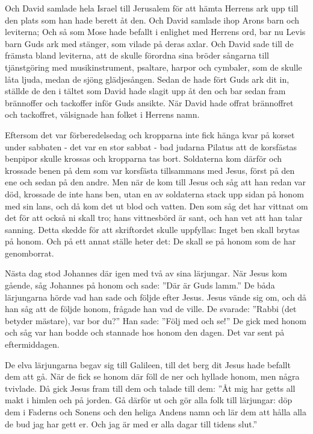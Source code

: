 {Och David samlade hela Israel till Jerusalem för att hämta Herrens ark upp till den plats som han hade berett åt den. 
Och David samlade ihop Arons barn och leviterna; 
Och så som Mose hade befallt i enlighet med Herrens ord, bar nu Levis barn Guds ark med stänger, som vilade på deras axlar.
Och David sade till de främsta bland leviterna, att de skulle förordna sina bröder sångarna till tjänstgöring med musikinstrument, psaltare, harpor och cymbaler, som de skulle låta ljuda, medan de sjöng glädjesången. 
Sedan de hade fört Guds ark dit in, ställde de den i tältet som David hade slagit upp åt den och bar sedan fram brännoffer och tackoffer inför Guds ansikte. 
När David hade offrat brännoffret och tackoffret, välsignade han folket i Herrens namn.}


{Eftersom det var förberedelsedag och kropparna inte fick hänga kvar på korset under sabbaten - det var en stor sabbat - bad judarna Pilatus att de korsfästas benpipor skulle krossas och kropparna tas bort. 
Soldaterna kom därför och krossade benen på dem som var korsfästa tillsammans med Jesus, först på den ene och sedan på den andre. 
Men när de kom till Jesus och såg att han redan var död, krossade de inte hans ben, utan en av soldaterna stack upp sidan på honom med sin lans, och då kom det ut blod och vatten. 
Den som såg det har vittnat om det för att också ni skall tro; hans vittnesbörd är sant, och han vet att han talar sanning. 
Detta skedde för att skriftordet skulle uppfyllas: Inget ben skall brytas på honom. 
Och på ett annat ställe heter det: De skall se på honom som de har genomborrat.}


{Nästa dag stod Johannes där igen med två av sina lärjungar. 
När Jesus kom gående, såg Johannes på honom och sade: ”Där är Guds lamm.” 
De båda lärjungarna hörde vad han sade och följde efter Jesus. 
Jesus vände sig om, och då han såg att de följde honom, frågade han vad de ville. De svarade: ”Rabbi (det betyder mästare), var bor du?” 
Han sade: ”Följ med och se!” De gick med honom och såg var han bodde och stannade hos honom den dagen. Det var sent på eftermiddagen.}


{
De elva lärjungarna begav sig till Galileen, till det berg dit Jesus hade befallt dem att gå. 
När de fick se honom där föll de ner och hyllade honom, men några tvivlade. 
Då gick Jesus fram till dem och talade till dem: ”Åt mig har getts all makt i himlen och på jorden. 
Gå därför ut och gör alla folk till lärjungar: döp dem i Faderns och Sonens och den heliga Andens namn och lär dem att hålla alla de bud jag har gett er. Och jag är med er alla dagar till tidens slut.”}




